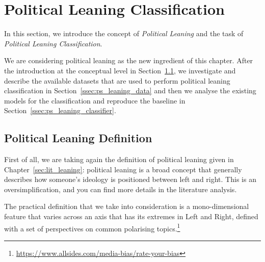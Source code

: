 \section{\statusgreen Political Leaning Classification}
\label{sec:ps_political_sides}

In this section, we introduce the concept of \emph{Political Leaning} and the task of \emph{Political Leaning Classification}.

We are considering political leaning as the new ingredient of this chapter. After the introduction at the conceptual level in Section~\ref{ssec:ps_leaning_def}, we investigate and describe the available datasets that are used to perform political leaning classification in Section~\ref{ssec:ps_leaning_data} and then we analyse the existing models for the classification and reproduce the baseline in Section~\ref{ssec:ps_leaning_classifier}.


\subsection{\statusgreen Political Leaning Definition}
\label{ssec:ps_leaning_def}

First of all, we are taking again the definition of political leaning given in Chapter~\ref{sec:lit_leaning}: political leaning is a broad concept that generally describes how someone's ideology is positioned between left and right. This is an oversimplification, and you can find more details in the literature analysis.

The practical definition that we take into consideration is a mono-dimensional feature that varies across an axis that has its extremes in Left and Right, defined with a set of perspectives on common polarising topics.\footnote{\url{https://www.allsides.com/media-bias/rate-your-bias}}




